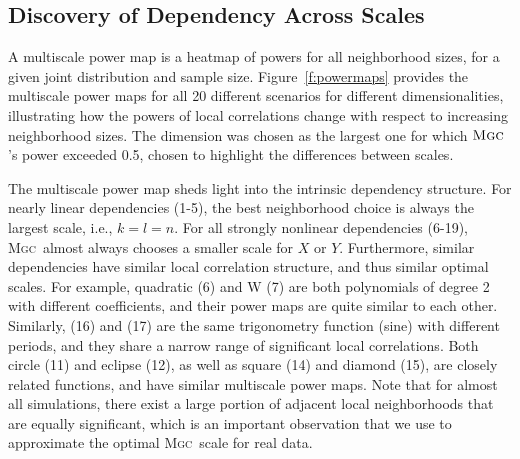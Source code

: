 \documentclass[11pt]{article}
\providecommand{\sct}[1]{{\normalfont\textsc{#1}}}
\newcommand{\Mgc}{\sct{Mgc}}
\newcommand{\Mgcp}{\sct{Mgc$_P$}}
\newcommand{\Hhg}{\sct{Hhg}}
\newcommand{\Dcorr}{\sct{Dcorr}}
\newcommand{\Mcorr}{\sct{Mcorr}}
\newcommand{\Mantel}{\sct{Mantel}}
\begin{document}




\subsection*{Discovery of Dependency Across Scales}
\label{main3}

A multiscale power map is a heatmap of powers for all neighborhood sizes, for a given joint distribution and sample size.
Figure~\ref{f:powermaps} provides the multiscale power maps for all 20 different scenarios for different dimensionalities, illustrating how the powers of local correlations change with respect to increasing neighborhood sizes.
The dimension was chosen as the largest one for which $\Mgc$'s power exceeded 0.5, chosen to highlight the differences between scales.

The multiscale power map sheds light into the intrinsic dependency structure.
For nearly linear dependencies (1-5), the best neighborhood choice is always the largest scale, i.e., $k=l=n$. For all strongly nonlinear dependencies (6-19), \Mgc~almost always chooses a smaller scale for $X$ or $Y$.
 Furthermore, similar dependencies have similar local correlation structure, and thus similar optimal scales. For example, quadratic (6) and W (7) are both polynomials of degree 2 with different coefficients, and their power maps are quite similar to each other. Similarly,  (16) and (17) are the same trigonometry function (sine) with different periods, and they share a narrow range of significant local correlations.
Both circle (11) and eclipse (12), as well as square (14) and diamond (15), are closely related functions, and have similar multiscale power maps.
Note that for almost all simulations, there exist a large portion of adjacent local neighborhoods that are equally significant, which is an important observation that we use to approximate the optimal \Mgc~scale for real data.
\end{document}
